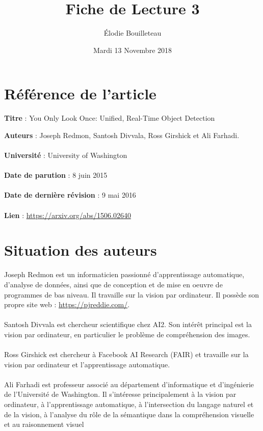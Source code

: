 \documentclass[11pt]{report}
\title{Fiche de Lecture 3}
\author{Élodie Bouilleteau}
\date{Mardi 13 Novembre 2018}
\begin{document}
\maketitle
\renewcommand{\thesection}{\arabic{section}} 

\section{Référence de l'article}
	\begin{flushleft}
		\textbf{Titre} : You Only Look Once: Unified, Real-Time Object Detection
	\end{flushleft}
	\textbf{Auteurs} : Joseph Redmon, Santosh Divvala, Ross Girshick et Ali Farhadi.\\\\
	\textbf{Université} : University of Washington\\\\
	\textbf{Date de parution} : 8 juin 2015\\\\
	\textbf{Date de dernière révision} : 9 mai 2016\\\\
	\textbf{Lien} : \url{https://arxiv.org/abs/1506.02640}
	
\section{Situation des auteurs}
Joseph Redmon est un informaticien passionné d’apprentissage automatique, d’analyse de données, ainsi que de conception et de mise en oeuvre de programmes de bas niveau. Il travaille sur la vision par ordinateur. Il possède son propre site web : \url{https://pjreddie.com/}.\\\\
Santosh Divvala est chercheur scientifique chez AI2. Son intérêt principal est la vision par ordinateur, en particulier le problème de compréhension des images.\\\\
Ross Girshick est chercheur à Facebook AI Research (FAIR) et travaille sur la vision par ordinateur et l'apprentissage automatique.\\\\
Ali Farhadi est professeur associé au département d'informatique et d'ingénierie de l'Université de Washington. Il s'intéresse principalement à la vision par ordinateur, à l'apprentissage automatique, à l'intersection du langage naturel et de la vision, à l'analyse du rôle de la sémantique dans la compréhension visuelle et au raisonnement visuel
\end{document}
